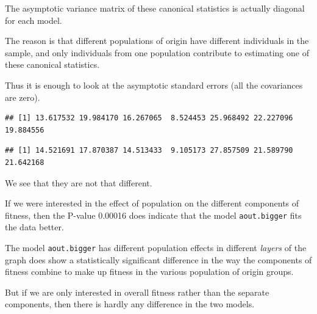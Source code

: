 \documentclass[
  ignorenonframetext,
]{beamer}
\newenvironment{Shaded}{\begin{snugshade}}{\end{snugshade}}
\newcommand{\NormalTok}[1]{#1}
\newcommand{\SpecialCharTok}[1]{\textcolor[rgb]{0.81,0.36,0.00}{\textbf{#1}}}
\begin{document}
\begin{frame}[fragile]{}
\protect\hypertarget{section-24}{}
The asymptotic variance matrix of these canonical statistics is actually
diagonal for each model.

The reason is that different populations of origin have different
individuals in the sample, and only individuals from one population
contribute to estimating one of these canonical statistics.

Thus it is enough to look at the asymptotic standard errors (all the
covariances are zero).

\vspace{12pt}
\tiny

\begin{Shaded}
\end{Shaded}

\begin{verbatim}
## [1] 13.617532 19.984170 16.267065  8.524453 25.968492 22.227096 19.884556
\end{verbatim}

\begin{Shaded}
\end{Shaded}

\begin{verbatim}
## [1] 14.521691 17.870387 14.513433  9.105173 27.857509 21.589790 21.642168
\end{verbatim}

\vspace{12pt}
\normalsize

We see that they are not that different.
\end{frame}

\begin{frame}{}
\protect\hypertarget{section-25}{}
If we were interested in the effect of population on the different
components of fitness, then the P-value 0.00016 does indicate that the
model \texttt{aout.bigger} fits the data better.

The model \texttt{aout.bigger} has different population effects in
different \emph{layers} of the graph does show a statistically
significant difference in the way the components of fitness combine to
make up fitness in the various population of origin groups.

But if we are only interested in overall fitness rather than the
separate components, then there is hardly any difference in the two
models.
\end{frame}
\end{document}
